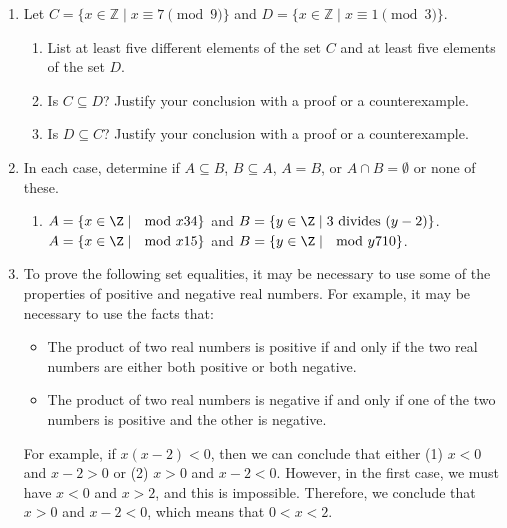 \begin{enumerate}
\item Let  $C = \{ x \in \mathbb{Z} \mid x \equiv 7 \pmod {9} \}$ and 
$D = \{ x \in \mathbb{Z} \mid x \equiv 1 \pmod {3} \}$.
\label{exer:modsubset2}%
\begin{enumerate}
\item List at least five different elements of the set $C$ and at least five elements of the set $D$.
\item Is $C \subseteq D$?  Justify your conclusion with a proof or a counterexample.
\item Is $D \subseteq C$?  Justify your conclusion with a proof or a counterexample.
\end{enumerate}


\item In each case, determine if $A \subseteq B$, $B \subseteq A$, $A = B$, or $A \cap B = \emptyset$ or none of these. 
\label{exer51:modsets}
\begin{enumerate}
  \yitem $A = \left\{ x \in \Z \mid \mod{x}{2}{3} \right\}$ and 
$B = \left\{ y \in \Z \mid 6 \text{ divides } (2y - 4) \right\}$.
  \item $A = \left\{ x \in \Z \mid \mod{x}{3}{4} \right\}$ and 
$B = \left\{ y \in \Z \mid 3 \text{ divides } (y - 2) \right\}$.
  \yitem $A = \left\{ x \in \Z \mid \mod{x}{1}{5} \right\}$ and 
$B = \left\{ y \in \Z \mid \mod{y}{7}{10} \right\}$.
\end{enumerate}



\item To prove the following set equalities, it may be necessary to use some of the properties of positive and negative real numbers.  For example, it may be necessary to use the facts that:
\begin{itemize}
\item The product of two real numbers is positive if and only if the two real numbers are either both positive or both negative.
\item The product of two real numbers is negative if and only if one of the two numbers is positive and the other is negative.
\end{itemize}
For example, if $x \left( x - 2 \right) < 0$, then we can conclude that either 
(1) $x < 0$ and $x - 2 > 0$ or (2) $x > 0$ and $x - 2 < 0$.  However, in the first case, we must have $x < 0$ and $x > 2$, and this is impossible.  Therefore, we conclude that 
$x > 0$ and $x - 2 < 0$, which means that $0 < x < 2$.


\end{enumerate}
